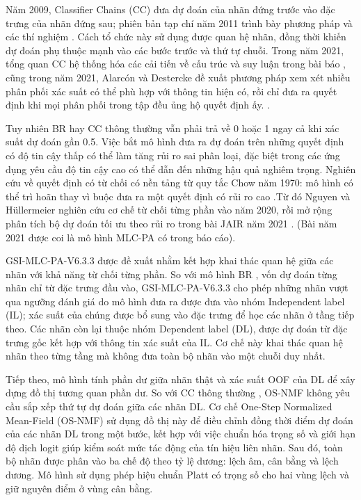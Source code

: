 \documentclass[11pt,a4paper]{article}
\begin{document}
Năm 2009, Classifier Chains (CC) đưa dự đoán của nhãn đứng trước vào đặc trưng của nhãn đứng sau; phiên bản tạp chí năm 2011 trình bày phương pháp và các thí nghiệm \cite{cc2011}. Cách tổ chức này sử dụng được quan hệ nhãn, đồng thời khiến dự đoán phụ thuộc mạnh vào các bước trước và thứ tự chuỗi. Trong năm 2021, tổng quan CC hệ thống hóa các cải tiến về cấu trúc và suy luận trong bài báo \cite{cc2021}, cũng trong năm 2021, Alarcón và Destercke đề xuất phương pháp xem xét nhiều phân phối xác suất có thể phù hợp với thông tin hiện có, rồi chỉ đưa ra quyết định khi mọi phân phối trong tập đều ủng hộ quyết định ấy. \cite{cc2021,skeptical2021}.

Tuy nhiên BR hay CC thông thường vẫn phải trả về 0 hoặc 1 ngay cả khi xác suất dự đoán gần 0.5. Việc bắt mô hình đưa ra đự đoán trên những quyết định có độ tin cậy thấp có thể làm tăng rủi ro sai phân loại, đặc biệt trong các ứng dụng yêu cầu độ tin cậy cao có thể dẫn đến những hậu quả nghiêm trọng. Nghiên cứu về quyết định có từ chối có nền tảng từ quy tắc Chow năm 1970: mô hình có thể trì hoãn thay vì buộc đưa ra một quyết định có rủi ro cao \cite{chow1970}.Từ đó Nguyen và Hüllermeier nghiên cứu cơ chế từ chối từng phần vào năm 2020, rồi mở rộng phân tích bộ dự đoán tối ưu theo rủi ro trong bài JAIR năm 2021 \cite{nguyen2020,nguyen2021}. (Bài năm 2021 được coi là mô hình MLC-PA có trong báo cáo).

GSI-MLC-PA-V6.3.3 được đề xuất nhằm kết hợp khai thác quan hệ giữa các nhãn với khả năng từ chối từng phần. So với mô hình BR \cite{br2018}, vốn dự đoán từng nhãn chỉ từ đặc trưng đầu vào, GSI-MLC-PA-V6.3.3 cho phép những nhãn vượt qua ngưỡng đánh giá do mô hình đưa ra được đưa vào nhóm Independent label (IL); xác suất của chúng được bổ sung vào đặc trưng để học các nhãn ở tầng tiếp theo. Các nhãn còn lại thuộc nhóm Dependent label (DL), được dự đoán từ đặc trưng gốc kết hợp với thông tin xác suất của IL. Cơ chế này khai thác quan hệ nhãn theo từng tầng mà không đưa toàn bộ nhãn vào một chuỗi duy nhất. 

Tiếp theo, mô hình tính phần dư giữa nhãn thật và xác suất OOF của DL để xây dựng đồ thị tương quan phần dư. So với CC thông thường \cite{cc2011}, OS-NMF không yêu cầu sắp xếp thứ tự dự đoán giữa các nhãn DL. Cơ chế One-Step Normalized Mean-Field (OS-NMF) sử dụng đồ thị này để điều chỉnh đồng thời điểm dự đoán của các nhãn DL trong một bước, kết hợp với việc chuẩn hóa trọng số và giới hạn độ dịch logit giúp kiểm soát mức tác động của tín hiệu liên nhãn. Sau đó, toàn bộ nhãn được phân vào ba chế độ theo tỷ lệ dương: lệch âm, cân bằng và lệch dương. Mô hình sử dụng phép hiệu chuẩn Platt có trọng số cho hai vùng lệch và giữ nguyên điểm ở vùng cân bằng. 
\end{document}
